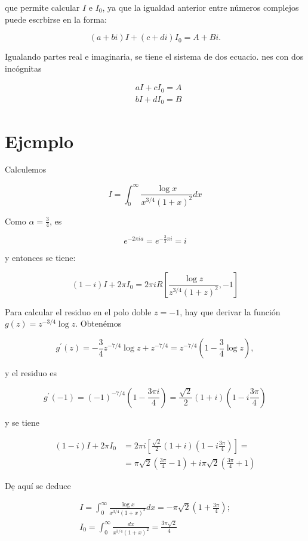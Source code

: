 \documentclass[10pt]{article}
\theoremstyle{plain}
\theoremstyle{definition}
\theoremstyle{remark}
\begin{document}
que permite calcular $I$ e $I_{0}$, ya que la igualdad anterior entre números complejos puede escrbirse en la forma:

$$
(a+b i) I+(c+d i) I_{0}=A+B i .
$$


Igualando partes real e imaginaria, se tiene el sistema de dos ecuacio. nes con dos incógnitas

$$
\begin{aligned}
& a I+c I_{0}=A \\
& b I+d I_{0}=B
\end{aligned}
$$

\section*{Ejcmplo}
Calculemos

$$
I=\int_{0}^{\infty} \frac{\log x}{x^{3 / 4}(1+x)^{2}} d x
$$

Como $\alpha=\frac{3}{4}$, es

$$
e^{-2 \pi i a}=e^{-\frac{3}{2} \pi i}=i
$$

y entonces se tiene:

$$
(1-i) I+2 \pi I_{0}=2 \pi i R\left[\frac{\log z}{z^{3 / 4}(1+z)^{2}},-1\right]
$$

Para calcular el residuo en el polo doble $z=-1$, hay que derivar la función $g(z)=z^{-3 / 4} \log z$. Obtenémos

$$
g^{\prime}(z)=-\frac{3}{4} z^{-7 / 4} \log z+z^{-7 / 4}=z^{-7 / 4}\left(1-\frac{3}{4} \log z\right),
$$

y el residuo es

$$
g^{\prime}(-1)=(-1)^{-7 / 4}\left(1-\frac{3 \pi i}{4}\right)=\frac{\sqrt{2}}{2}(1+i)\left(1-i \frac{3 \pi}{4}\right)
$$

y se tiene

$$
\begin{aligned}
(1-i) I+2 \pi I_{0} & =2 \pi i\left[\frac{\sqrt{2}}{2}(1+i)\left(1-i \frac{3 \pi}{4}\right)\right]= \\
& =\pi \sqrt{2}\left(\frac{3 \pi}{4}-1\right)+i \pi \sqrt{2}\left(\frac{3 \pi}{4}+1\right)
\end{aligned}
$$

Dẹ aquí se deduce

$$
\begin{gathered}
I=\int_{0}^{\infty} \frac{\log x}{x^{3 / 4}(1+x)^{2}} d x=-\pi \sqrt{2}\left(1+\frac{3 \pi}{4}\right) ; \\
I_{0}=\int_{0}^{\infty} \frac{d x}{x^{3 / 4}(1+x)^{2}}=\frac{3 \pi \sqrt{2}}{4}
\end{gathered}
$$
\end{document}
